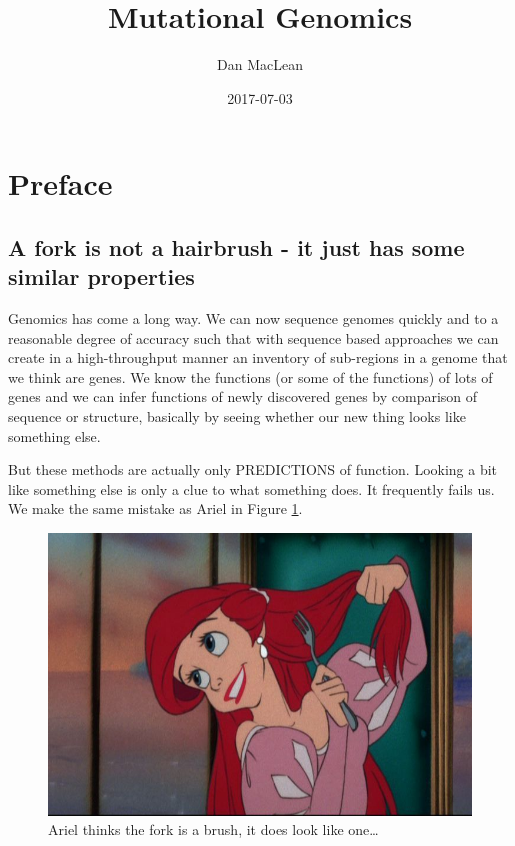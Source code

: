 \documentclass[12pt,]{book}
\title{Mutational Genomics}
\author{Dan MacLean}
\date{2017-07-03}
\theoremstyle{definition}
\theoremstyle{definition}
\theoremstyle{remark}
\begin{document}
\maketitle

{
\setcounter{tocdepth}{1}
\tableofcontents
}
\listoffigures
\chapter*{Preface}\label{preface}

\section*{A fork is not a hairbrush - it just has some similar
properties}\label{a-fork-is-not-a-hairbrush---it-just-has-some-similar-properties}

Genomics has come a long way. We can now sequence genomes quickly and to
a reasonable degree of accuracy such that with sequence based approaches
we can create in a high-throughput manner an inventory of sub-regions in
a genome that we think are genes. We know the functions (or some of the
functions) of lots of genes and we can infer functions of newly
discovered genes by comparison of sequence or structure, basically by
seeing whether our new thing looks like something else.

But these methods are actually only PREDICTIONS of function. Looking a
bit like something else is only a clue to what something does. It
frequently fails us. We make the same mistake as Ariel in Figure
\ref{fig:ariel}.




\begin{figure}
\includegraphics[width=4.8in]{assets/ariel} \caption{Ariel thinks the fork is a brush, it does look like
one\ldots{}}\label{fig:ariel}
\end{figure}
\end{document}
